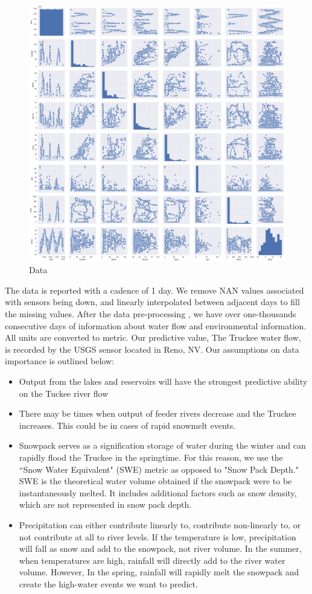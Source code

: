 \documentclass[11pt]{article}
\begin{document}
\begin{figure}[h]
\centering\includegraphics[width=.8\linewidth]{data.png}
\caption{Data}
\label{Fig. 2}
\end{figure}

The data is reported with a cadence of 1 day. We remove NAN values associated with sensors being down, and linearly interpolated between adjacent days to fill the missing values. After the data pre-processing \cite{github:aa}, we have over one-thousands consecutive days of information about water flow and environmental information. All units are converted to metric. Our predictive value, The Truckee water flow, is recorded by the USGS sensor located in Reno, NV.
Our assumptions on data importance is outlined below:

\begin{itemize}
\item Output from the lakes and reservoirs will have the strongest predictive ability on the Tuckee river flow
\item There may be times when output of feeder rivers decrease and the Truckee increases. This could be in cases of rapid snowmelt events.
\item Snowpack serves as a signification storage of water during the winter and can rapidly flood the Truckee in the springtime. For this reason, we use the ``Snow Water Equivalent" (SWE) metric as opposed to "Snow Pack Depth." SWE is the theoretical water volume obtained if the snowpack were to be instantaneously melted.  It includes additional factors such as snow density, which are not represented in snow pack depth.
\item Precipitation can either contribute linearly to, contribute non-linearly to,  or not contribute at all to river levels. If the temperature is low, precipitation will fall as snow and add to the snowpack, not river volume. In the summer, when temperatures are high, rainfall will directly add to the river water volume. However, In the spring, rainfall will rapidly melt the snowpack and create the high-water events we want to predict.
\end{itemize}
\end{document}
